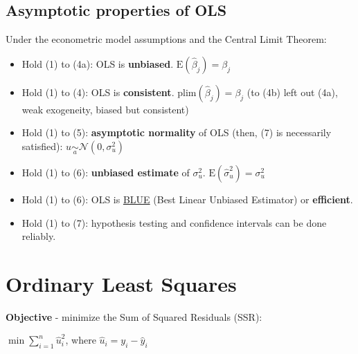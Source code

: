 \documentclass[10pt, a4paper, landscape]{extarticle}
\newcommand{\E}{\mathrm{E}}
\begin{document}
\begin{multicols}{3}
	\subsection*{Asymptotic properties of OLS}
		Under the econometric model assumptions and the Central Limit Theorem:
		\begin{itemize}[leftmargin=*]
			\item Hold (1) to (4a): OLS is \textbf{unbiased}. $\E(\hat{\beta}_j) = \beta_j$
			\item Hold (1) to (4): OLS is \textbf{consistent}. $\mathrm{plim}(\hat{\beta}_j) = \beta_j$ (to (4b) left out (4a), weak exogeneity, biased but consistent)
			\item Hold (1) to (5): \textbf{asymptotic normality} of OLS (then, (7) is necessarily satisfied): $u \underset{a}{\sim} \mathcal{N}(0,\sigma^2_u)$
			\item Hold (1) to (6): \textbf{unbiased estimate} of $\sigma^2_u$. $\E(\hat{\sigma}^2_u) = \sigma^2_u$
			\item Hold (1) to (6): OLS is \textcolor{blue}{\href{https://www.youtube.com/watch?v=68ugkg9RePc}{BLUE}} (Best Linear Unbiased Estimator) or \textbf{efficient}. 
			\item Hold (1) to (7): hypothesis testing and confidence intervals can be done reliably.
		\end{itemize}

\section*{Ordinary Least Squares}
	\textbf{Objective} - minimize the Sum of Squared Residuals (SSR):
	\begin{center}
		$\min \sum_{i=1}^n \hat{u}_i^2$, where $\hat{u}_i = y_i - \hat{y}_i$
	\end{center}

\end{multicols}
\end{document}
